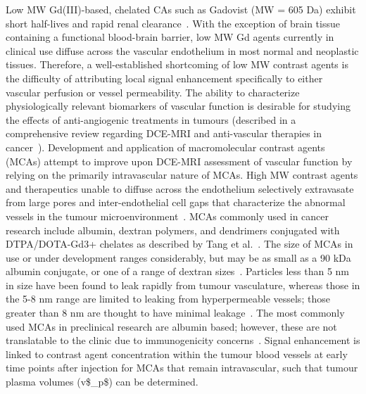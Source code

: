 Low \acs{MW} Gd(III)-based, chelated \acs{CA}s such as Gadovist (\acs{MW} = 605 \acs{Da}) exhibit short half-lives and rapid renal clearance~\cite{Weinmann:1984gv}.
With the exception of brain tissue containing a functional blood-brain barrier, low \acs{MW} Gd agents currently in clinical use diffuse across the vascular endothelium in most normal and neoplastic tissues.
Therefore, a well-established shortcoming of low \acs{MW} contrast agents is the difficulty of attributing local signal enhancement specifically to either vascular perfusion or vessel permeability.
The ability to characterize physiologically relevant biomarkers of vascular function is desirable for studying the effects of anti-angiogenic treatments in tumours (described in a comprehensive review regarding DCE-MRI and anti-vascular therapies in cancer~\cite{OConnor:2012ie}).
Development and application of macromolecular contrast agents (\acs{MCA}s) attempt to improve upon DCE-MRI assessment of vascular function by relying on the primarily intravascular nature of \acs{MCA}s.
High \acs{MW} contrast agents and therapeutics unable to diffuse across the endothelium selectively extravasate from large pores and inter-endothelial cell gaps that characterize the abnormal vessels in the tumour microenvironment~\cite{McDonald:2002ut,Hashizume:2000bq}.
\acs{MCA}s commonly used in cancer research include albumin, dextran polymers, and dendrimers conjugated with DTPA/DOTA-Gd3+ chelates as described by Tang et al.~\cite{Tang:2013fi}.
The size of \acs{MCA}s in use or under development ranges considerably, but may be as small as a 90 \acs{kDa} albumin conjugate, or one of a range of dextran sizes~\cite{Barrett:2006jx}.
Particles less than 5 nm in size have been found to leak rapidly from tumour vasculature, whereas those in the 5-8 nm range are limited to leaking from hyperpermeable vessels; those greater than 8 nm are thought to have minimal leakage~\cite{Kobayashi:2004vq,Sato:2001tt}.
The most commonly used \acs{MCA}s in preclinical research are albumin based; however, these are not translatable to the clinic due to immunogenicity concerns~\cite{Ogan:1987tg}.
Signal enhancement is linked to contrast agent concentration within the tumour blood vessels at early time points after injection for \acs{MCA}s that remain intravascular, such that tumour plasma volumes (\acs{v$_p$}) can be determined.

